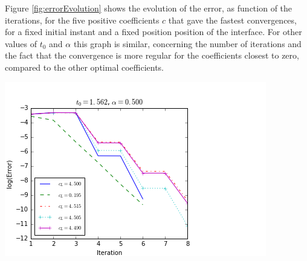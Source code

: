 
\indent Figure \ref{fig:errorEvolution} shows the evolution of the error, as function of the iterations, for the five positive coefficients $c$ that gave the fastest convergences, for a fixed initial instant and a fixed position position of the interface. For other values of $t_0$ and $\alpha$ this graph is similar, concerning the number of iterations and the fact that the convergence is more regular for the coefficients closest to zero, compared to the other optimal coefficients.

\begingroup
\begin{center}
\includegraphics[scale=.6]{figures/FinalFigures/errorEvolutionFixedT0CFinalVersionOnlyPositive.png}
\end{center}
\endgroup

